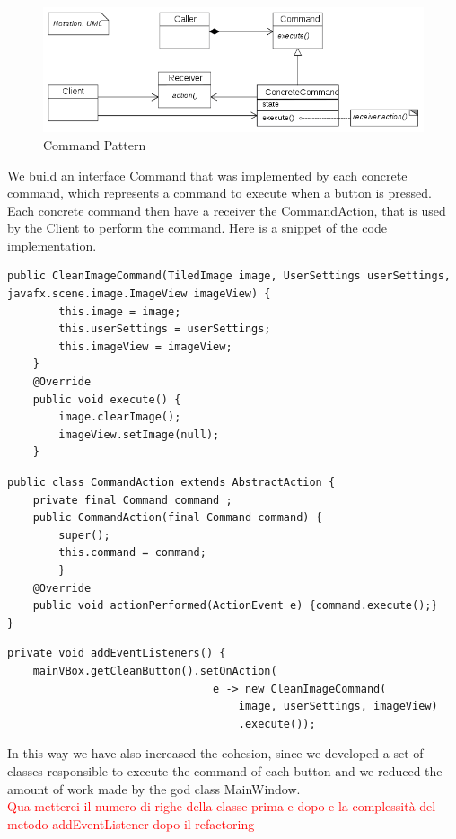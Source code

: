 \documentclass{article}
\begin{document}
\begin{figure}[!htb]
    \centering
    \includegraphics[width=1\linewidth]{700px-Command_pattern.svg.png}
    \caption{Command Pattern}
    \label{fig:my_label}
\end{figure}
\newpage
We build an interface Command that was implemented by each concrete command, which represents a command to execute when a button is pressed.
Each concrete command then have a receiver the CommandAction, that is used by the Client to perform the command.
Here is a snippet of the code implementation.
\begin{lstlisting}[caption={Command},captionpos=b]
public CleanImageCommand(TiledImage image, UserSettings userSettings, javafx.scene.image.ImageView imageView) {
        this.image = image;
        this.userSettings = userSettings;
        this.imageView = imageView;
    }
    @Override
    public void execute() {
        image.clearImage();
        imageView.setImage(null);
    }
\end{lstlisting}

\begin{lstlisting}[caption={Reciever},captionpos=b]
public class CommandAction extends AbstractAction {
    private final Command command ;
    public CommandAction(final Command command) {
        super();
        this.command = command;
        }
    @Override
    public void actionPerformed(ActionEvent e) {command.execute();}
}
\end{lstlisting}

\begin{lstlisting}[caption={Client},captionpos =b]
 private void addEventListeners() {
    mainVBox.getCleanButton().setOnAction(
                                e -> new CleanImageCommand(
                                    image, userSettings, imageView)
                                    .execute());
\end{lstlisting}
In this way we have also increased the cohesion, since we developed a set of classes responsible to execute the command of each button and we reduced the amount of work made by the god class MainWindow.\\
\textcolor{red}{Qua metterei il numero di righe della classe prima e dopo e la complessità del metodo addEventListener dopo il refactoring}
\end{document}

